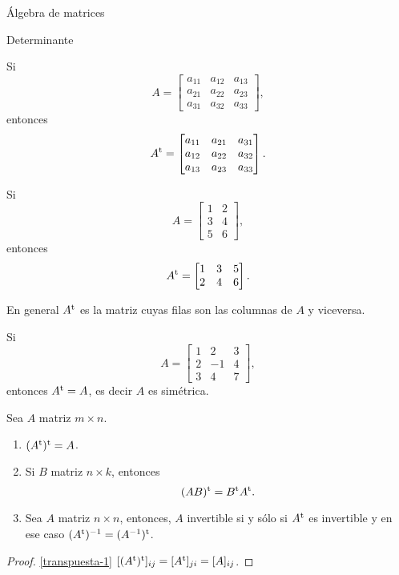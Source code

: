 \begin{chapter}{\'Algebra de matrices}
\begin{section}{Determinante}
    \begin{ejemplo*} Si
        $$A=\begin{bmatrix}a_{11}&a_{12}&a_{13}\\a_{21}&a_{22}&a_{23}\\a_{31}&a_{32}&a_{33}\end{bmatrix},$$ 
        entonces
        $$A^{\operatorname{t}}=\begin{bmatrix}a_{11}&a_{21}&a_{31}\\a_{12}&a_{22}&a_{32}\\a_{13}&a_{23}&a_{33}\end{bmatrix}.$$ 
    \end{ejemplo*}
    
    \begin{ejemplo*}
        Si $$A=\begin{bmatrix}1&2\\3&4\\5&6\end{bmatrix},$$ 
        entonces
        $$A^{\operatorname{t}}=\begin{bmatrix}1&3&5\\2&4&6\end{bmatrix}.$$ 
    \end{ejemplo*}
    
    
    En  general $A^{\operatorname{t}}$ es la matriz cuyas filas son las columnas de $A$ y viceversa. 
    
    \begin{ejemplo*}
        Si 
        \begin{equation*}
            A=\begin{bmatrix}1&2&3\\2&-1&4\\3&4&7\end{bmatrix},
        \end{equation*}
        entonces $A^{\operatorname{t}} =A$, es decir  $A$ es simétrica.
    \end{ejemplo*}
    
    \begin{proposicion}\label{prop-matriz-transpuesta} Sea $A$ matriz $m \times n$.
        \begin{enumerate}
            \item\label{transpuesta-1} $(A^{\operatorname{t}})^{\operatorname{t}} = A$.
            \item\label{transpuesta-2}  Si $B$ matriz $n \times k$,  entonces
            \begin{equation*}
            (AB)^{\operatorname{t}} = B^{\operatorname{t}} A^{\operatorname{t}}.
            \end{equation*} 
            \item\label{transpuesta-3}  Sea $A$ matriz $n \times n$, entonces, $A$ invertible si y sólo si  $A^{\operatorname{t}}$ es invertible y  en ese caso $(A^{\operatorname{t}})^{-1} = (A^{-1})^{\operatorname{t}}$.
        \end{enumerate}
    \end{proposicion}
    \begin{proof}
        \ref{transpuesta-1}     $[(A^{\operatorname{t}})^{\operatorname{t}}]_{ij} = [A^{\operatorname{t}}]_{ji} = [A]_{ij}$. 


\end{proof}
\end{section}
\end{chapter}
